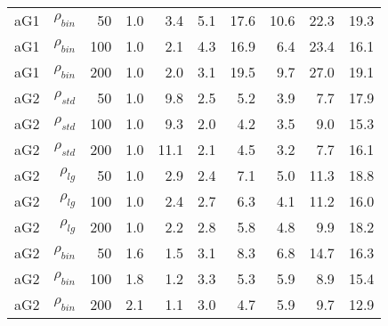 \documentclass[twoside,11pt]{article}
\begin{document}
\begin{table}
\begin{tabular}{rrrrrrrrrr}
\hline
aG1   & $\rho_{bin}$ & 50    & 1.0   & 3.4   & 5.1   & 17.6  & 10.6  & 22.3  & 19.3 \bigstrut[t]\\
aG1   & $\rho_{bin}$ & 100   & 1.0   & 2.1   & 4.3   & 16.9  & 6.4   & 23.4  & 16.1 \\
aG1   & $\rho_{bin}$ & 200   & 1.0   & 2.0   & 3.1   & 19.5  & 9.7   & 27.0  & 19.1 \bigstrut[b]\\
\hline
aG2   & $\rho_{std}$ & 50    & 1.0   & 9.8   & 2.5   & 5.2   & 3.9   & 7.7   & 17.9 \bigstrut[t]\\
aG2   & $\rho_{std}$ & 100   & 1.0   & 9.3   & 2.0   & 4.2   & 3.5   & 9.0   & 15.3 \\
aG2   & $\rho_{std}$ & 200   & 1.0   & 11.1  & 2.1   & 4.5   & 3.2   & 7.7   & 16.1 \bigstrut[b]\\
\hline
aG2   & $\rho_{lg}$ & 50    & 1.0   & 2.9   & 2.4   & 7.1   & 5.0   & 11.3  & 18.8 \bigstrut[t]\\
aG2   & $\rho_{lg}$ & 100   & 1.0   & 2.4   & 2.7   & 6.3   & 4.1   & 11.2  & 16.0 \\
aG2   & $\rho_{lg}$ & 200   & 1.0   & 2.2   & 2.8   & 5.8   & 4.8   & 9.9   & 18.2 \bigstrut[b]\\
\hline
aG2   & $\rho_{bin}$ & 50    & 1.6   & 1.5   & 3.1   & 8.3   & 6.8   & 14.7  & 16.3 \bigstrut[t]\\
aG2   & $\rho_{bin}$ & 100   & 1.8   & 1.2   & 3.3   & 5.3   & 5.9   & 8.9   & 15.4 \\
aG2   & $\rho_{bin}$ & 200   & 2.1   & 1.1   & 3.0   & 4.7   & 5.9   & 9.7   & 12.9 \bigstrut[b]\\
\hline
\end{tabular}%
\label{varrank1}%
\end{table}%
\end{document}
